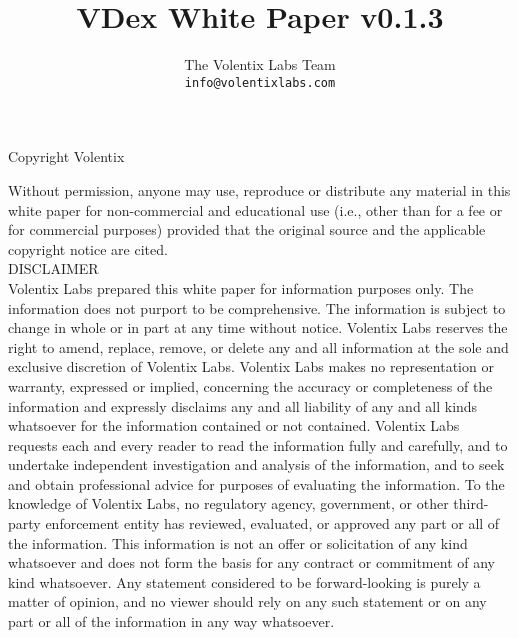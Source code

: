 \documentclass[]{article}
\title{VDex White Paper v0.1.3}
\author{
		The Volentix Labs Team\\
	\texttt{info@volentixlabs.com}
}
\begin{document}
\tableofcontents
\maketitle
\begin{description}
\item Copyright  Volentix
\end{description}

{\tiny Without permission, anyone may use, reproduce or distribute any material in this white paper for non-commercial and educational use (i.e., other than for a fee or for commercial purposes) provided that the original source and the applicable copyright notice are cited.\\

DISCLAIMER \\

Volentix Labs prepared this white paper for information purposes only. The information does not purport to be comprehensive. The information is subject to change in whole or in part at any time without notice. Volentix Labs reserves the right to amend, replace, remove, or delete any and all information at the sole and exclusive discretion of Volentix Labs. Volentix Labs makes no representation or warranty, expressed or implied, concerning the accuracy or completeness of the information and expressly disclaims any and all liability of any and all kinds whatsoever for the information contained or not contained. Volentix Labs requests each and every reader to read the information fully and carefully, and to undertake independent investigation and analysis of the information, and to seek and obtain professional advice for purposes of evaluating the information. To the knowledge of Volentix Labs, no regulatory agency, government, or other third-party enforcement entity has reviewed, evaluated, or approved any part or all of the information. This information is not an offer or solicitation of any kind whatsoever and does not form the basis for any contract or commitment of any kind whatsoever. Any statement considered to be forward-looking is purely a matter of opinion, and no viewer should rely on any such statement or on any part or all of the information in any way whatsoever.

}
\end{document}
